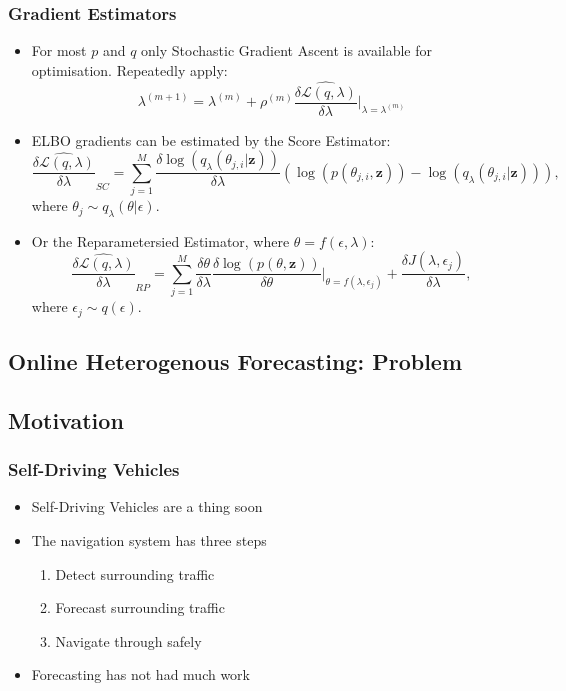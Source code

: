 \documentclass[8pt]{beamer}\usepackage[]{graphicx}\usepackage[]{color}
\begin{document}
\begin{frame}
\frametitle{Gradient Estimators}
\begin{itemize}
\item For most $p$ and $q$ only Stochastic Gradient Ascent is available for optimisation. Repeatedly apply:
\begin{equation}
\label{gradientAscent}
\lambda^{(m+1)} = \lambda^{(m)} + \rho^{(m)} \widehat{\frac{\delta\mathcal{L}(q, \lambda)}{\delta \lambda}} \bigg\rvert_{\lambda = \lambda^{(m)}}
\end{equation}
\item ELBO gradients can be estimated by the Score Estimator:
\begin{equation}
\label{scoreDeriv}
\widehat{\frac{\delta\mathcal{L}(q, \lambda)}{\delta \lambda}}_{SC} = \sum_{j = 1}^M \frac{\delta \log(q_{\lambda}(\theta_{j, i} | \textbf{z}))}{\delta \lambda} \left(\log(p(\theta_{j, i}, \textbf{z})) - \log(q_{\lambda}(\theta_{j, i} | \textbf{z})) \right),
\end{equation}
where $\theta_j \sim q_{\lambda}(\theta | \epsilon)$.
\item Or the Reparametersied Estimator, where $\theta = f(\epsilon, \lambda)$:
\begin{equation}
\label{rpDeriv}
\widehat{\frac{\delta\mathcal{L}(q, \lambda)}{\delta \lambda}}_{RP} = \sum_{j = 1}^M \frac{\delta \theta}{\delta \lambda} \frac{\delta \log(p(\theta, \textbf{z}))}{\delta \theta} \bigg\rvert_{\theta = f(\lambda, \epsilon_j)} + \frac{\delta J(\lambda, \epsilon_j)}{\delta \lambda}, 
\end{equation}
where $\epsilon_j \sim q(\epsilon)$.
\end{itemize}
\end{frame}

\begin{frame}
\section{Online Heterogenous Forecasting: Problem}
\subsection{Motivation}
\frametitle{Self-Driving Vehicles}
\begin{itemize}
\item Self-Driving Vehicles are a thing soon
\item The navigation system has three steps
\begin{enumerate}
\item Detect surrounding traffic
\item Forecast surrounding traffic
\item Navigate through safely
\end{enumerate}
\item Forecasting has not had much work
\end{itemize}
\end{frame}
\end{document}
